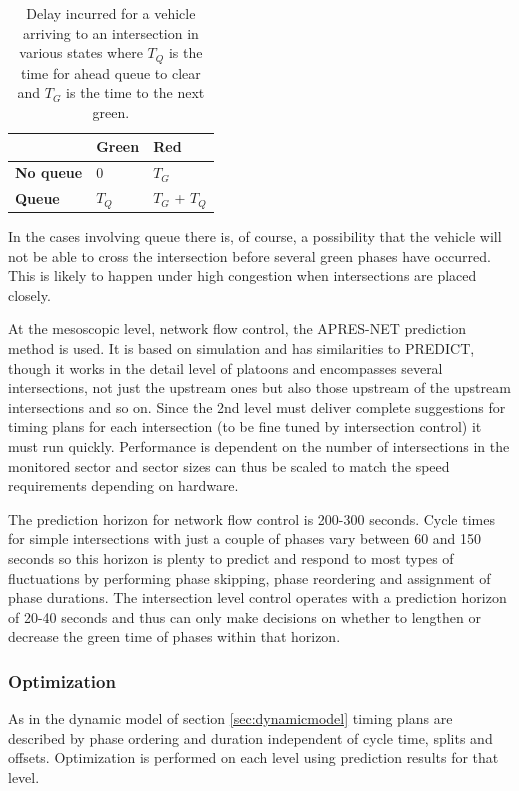 \begin{table}[!ht]
\begin{center}
\begin{tabular}{l|ll}
 & \textbf{Green} & \textbf{Red} \\ \hline
\textbf{No queue} & 0 & $T_G$ \\
\textbf{Queue} & $T_Q$ & $T_G$ + $T_Q$
\end{tabular}
\end{center}
\caption{Delay incurred for a vehicle arriving to an intersection in various states where $T_Q$ is the time for ahead queue to clear and $T_G$ is the time to the next green.}
\label{tbl:delaycases}
\end{table}

In the cases involving queue there is, of course, a possibility that
the vehicle will not be able to cross the intersection before several
green phases have occurred. This is likely to happen under high
congestion when intersections are placed closely.

At the mesoscopic level, network flow control, the APRES-NET
prediction method is used. It is based on simulation and has
similarities to PREDICT, though it works in the detail level of
platoons and encompasses several intersections, not just the upstream
ones but also those upstream of the upstream intersections and so
on. Since the 2nd level must deliver complete suggestions for timing
plans for each intersection (to be fine tuned by intersection control)
it must run quickly. Performance is dependent on the number of
intersections in the monitored sector and sector sizes can thus be
scaled to match the speed requirements depending on hardware.

The prediction horizon for network flow control is 200-300
seconds. Cycle times for simple intersections with just a couple of
phases vary between 60 and 150 seconds so this horizon is plenty to
predict and respond to most types of fluctuations by performing phase
skipping, phase reordering and assignment of phase durations. The
intersection level control operates with a prediction horizon of 20-40
seconds and thus can only make decisions on whether to lengthen or
decrease the green time of phases within that horizon.

\subsubsection*{Optimization}
As in the dynamic model of section \ref{sec:dynamicmodel} timing plans are
described by phase ordering and duration independent of cycle time,
splits and offsets.  Optimization is performed on each level using
prediction results for that level.

